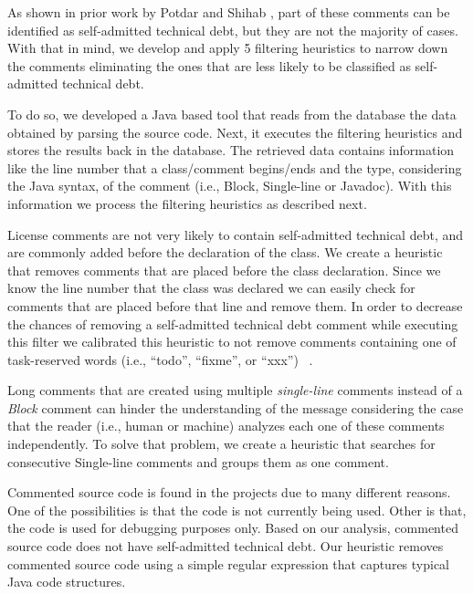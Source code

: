 As shown in prior work by Potdar and Shihab \cite{Potdar2014ICSME}, part of these comments can be identified as self-admitted technical debt, but they are not the majority of cases. With that in mind, we develop and apply 5 filtering heuristics to narrow down the comments eliminating the ones that are less likely to be classified as self-admitted technical debt.

To do so, we developed a Java based tool that reads from the database the data obtained by parsing the source code. Next, it executes the filtering heuristics and stores the results back in the database. The retrieved data contains information like the line number that a class/comment begins/ends and the type, considering the Java syntax, of the comment (i.e., Block, Single-line or Javadoc). With this information we process the filtering heuristics as described next.

License comments are not very likely to contain self-admitted technical debt, and are commonly added before the declaration of the class. We create a heuristic that removes comments that are placed before the class declaration. Since we know the line number that the class was declared we can easily check for comments that are placed before that line and remove them. In order to decrease the chances of removing a self-admitted technical debt comment while executing this filter we calibrated this heuristic to not remove comments containing one of task-reserved words (i.e., ``todo'', ``fixme'', or ``xxx'') ~\cite{Storey2008ICSE}.

Long comments that are created using multiple \emph{single-line} comments instead of a \emph{Block} comment can hinder the understanding of the message considering the case that the reader (i.e., human or machine) analyzes each one of these comments independently. To solve that problem, we create a heuristic that searches for consecutive Single-line comments and groups them as one comment.
 
Commented source code is found in the projects due to many different reasons. One of the possibilities is that the code is not currently being used. Other is that, the code is used for debugging purposes only. Based on our analysis, commented source code does not have self-admitted technical debt. Our heuristic removes commented source code using a simple regular expression that captures typical Java code structures.

